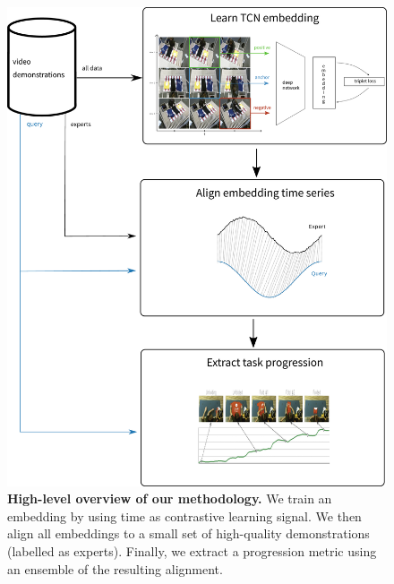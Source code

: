 \documentclass[\home/main.tex]{subfiles}
\begin{document}
\begin{figure}[htbp]
    \centering
    \includegraphics[width=\textwidth]{figures/fig_complete_overview.eps}
    \caption[High-level overview of our reward-learning methodology.]{{\textbf{High-level overview of our methodology.}} We train an embedding by using time as contrastive learning signal. We then align all embeddings to a small set of high-quality demonstrations (labelled as experts). Finally, we extract a progression metric using an ensemble of the resulting alignment. }
    \label{fig:rewards_overview_framework}
\end{figure}
\end{document}
